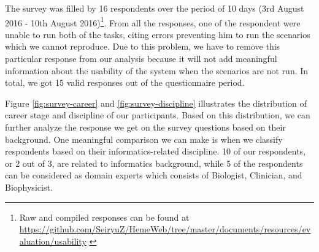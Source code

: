 \vspace{0.5cm}

\vspace{0.5cm}

\noindent%
\begin{minipage}{\linewidth}%
 \label{fig:survey-discipline}%
\end{minipage}

\vspace{0.5cm}


The survey was filled by 16 respondents over the period of 10 days (3rd August 2016 - 10th August 2016)\footnote{Raw and compiled responses can be found at \url{https://github.com/SeiryuZ/HemeWeb/tree/master/documents/resources/evaluation/usability} \label{footnote:response}}. From all the responses, one of the respondent were unable to run both of the tasks, citing errors preventing him to run the scenarios which we cannot reproduce. Due to this problem, we have to remove this particular response from our analysis because it will not add meaningful information about the usability of the system when the scenarios are not run. In total, we got 15 valid responses out of the questionnaire period.

Figure \ref{fig:survey-career} and \ref{fig:survey-discipline} illustrates the distribution of career stage and discipline of our participants. Based on this distribution, we can further analyze the response we get on the survey questions based on their background. One meaningful comparison we can make is when we classify respondents based on their informatics-related discipline. 10 of our respondents, or 2 out of 3, are related to informatics background, while 5 of the respondents can be considered as domain experts which consists of Biologist, Clinician, and Biophysicist.


